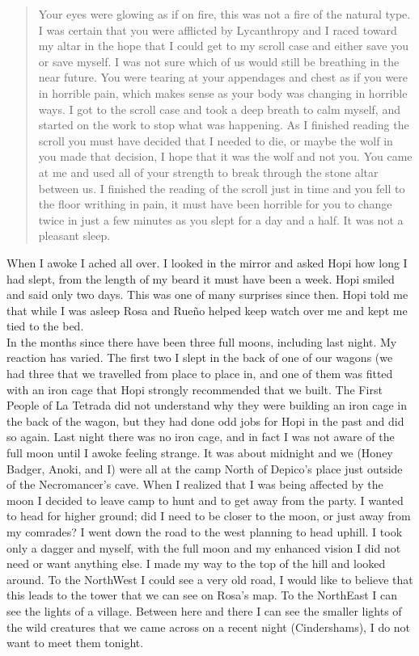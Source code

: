 \documentclass[11pt]{article}
\begin{document}
\begin{quote}
    Your eyes were glowing as if on fire, this was not a fire of the natural type. I was certain that you were afflicted by Lycanthropy and I raced toward my altar in the hope that I could get to my scroll case and either save you or save myself. I was not sure which of us would still be breathing in the near future. You were tearing at your appendages and chest as if you were in horrible pain, which makes sense as your body was changing in horrible ways. I got to the scroll case and took a deep breath to calm myself, and started on the work to stop what was happening. As I finished reading the scroll you must have decided that I needed to die, or maybe the wolf in you made that decision, I hope that it was the wolf and not you. You came at me and used all of your strength to break through the stone altar between us. I finished the reading of the scroll just in time and you fell to the floor writhing in pain, it must have been horrible for you to change twice in just a few minutes as you slept for a day and a half. It was not a pleasant sleep.
\end{quote}

When I awoke I ached all over. I looked in the mirror and asked Hopi how long I had slept, from the length of my beard it must have been a week. Hopi smiled and said only two days. This was one of many surprises since then. Hopi told me that while I was asleep Rosa and Rueño helped keep watch over me and kept me tied to the bed.\\

In the months since there have been three full moons, including last night. My reaction has varied. The first two I slept in the back of one of our wagons (we had three that we travelled from place to place in, and one of them was fitted with an iron cage that Hopi strongly recommended that we built. The First People of La Tetrada did not understand why they were building an iron cage in the back of the wagon, but they had done odd jobs for Hopi in the past and did so again.
Last night there was no iron cage, and in fact I was not aware of the full moon until I awoke feeling strange. It was about midnight and we (Honey Badger, Anoki, and I) were all at the camp North of Depico’s place just outside of the Necromancer’s cave. When I realized that I was being affected by the moon I decided to leave camp to hunt and to get away from the party. I wanted to head for higher ground; did I need to be closer to the moon, or just away from my comrades? I went down the road to the west planning to head uphill. I took only a dagger and myself, with the full moon and my enhanced vision I did not need or want anything else. I made my way to the top of the hill and looked around. To the NorthWest I could see a very old road, I would like to believe that this leads to the tower that we can see on Rosa’s map. To the NorthEast I can see the lights of a village. Between here and there I can see the smaller lights of the wild creatures that we came across on a recent night (Cindershams), I do not want to meet them tonight.
\end{document}

